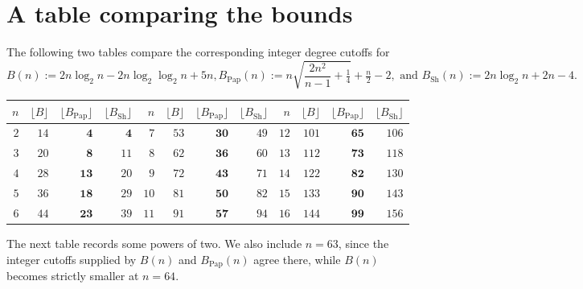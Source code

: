 \documentclass[11pt]{article}
\newtheorem{auxiliary proposition}[theorem]{Auxiliary Proposition}
\newtheorem{main conjecture}[theorem]{Main Conjecture}
\newtheorem{main theorem}[theorem]{Main Theorem}
\newtheorem{modesty proposition}[theorem]{Modesty Proposition}
\newtheorem{open problem}[theorem]{Open Problem}
\newtheorem{convergence lemma}[theorem]{Convergence Lemma}
\newtheorem{corrected lemma}[theorem]{Corrected Lemma}
\newtheorem{growth lemma}[theorem]{Growth Lemma}
\newtheorem{coefficient lemma}[theorem]{Integrality Lemma}
\newtheorem{interpolation lemma}[theorem]{Interpolation Lemma}
\newtheorem{kernel lemma}[theorem]{Kernel Lemma}
\newtheorem{limit lemma}[theorem]{Limit Lemma}
\newtheorem{tandem lemma}[theorem]{Modesty Lemma}
\newtheorem{zero-finding lemma}[theorem]{Zero-Finding Lemma}
\numberwithin{equation}{section}
\begin{document}
\section{A table comparing the bounds}

The following two tables compare the corresponding integer degree
cutoffs for {\small
$$ B(n):=2n\log_2 n-2n\log_2\log_2 n+5n,
B_{\mathrm{Pap}}(n):=n\sqrt{\frac{2n^2}{n-1}+\tfrac14}+\tfrac n2-2,
\text{ and }B_{\mathrm{Sh}}(n):=2n\log_2 n+2n-4. $$}
  

\begin{center}
\scriptsize
\setlength{\tabcolsep}{3pt}
\begin{tabular}{rrrr|rrrr|rrrr}
\toprule
$n$ & $\lfloor B\rfloor$ & $\lfloor B_{\mathrm{Pap}}\rfloor$ & $\lfloor B_{\mathrm{Sh}}\rfloor$ &
$n$ & $\lfloor B\rfloor$ & $\lfloor B_{\mathrm{Pap}}\rfloor$ & $\lfloor B_{\mathrm{Sh}}\rfloor$ &
$n$ & $\lfloor B\rfloor$ & $\lfloor B_{\mathrm{Pap}}\rfloor$ & $\lfloor B_{\mathrm{Sh}}\rfloor$ \\
\midrule
$2$ & $14$ & $\mathbf{4}$ & $\mathbf{4}$
&
$7$ & $53$ & $\mathbf{30}$ & $49$
&
$12$ & $101$ & $\mathbf{65}$ & $106$ \\

$3$ & $20$ & $\mathbf{8}$ & $11$
&
$8$ & $62$ & $\mathbf{36}$ & $60$
&
$13$ & $112$ & $\mathbf{73}$ & $118$ \\


$4$ & $28$ & $\mathbf{13}$ & $20$
&
$9$ & $72$ & $\mathbf{43}$ & $71$
&
$14$ & $122$ & $\mathbf{82}$ & $130$ \\

$5$ & $36$ & $\mathbf{18}$ & $29$
&
$10$ & $81$ & $\mathbf{50}$ & $82$
&
$15$ & $133$ & $\mathbf{90}$ & $143$ \\

$6$ & $44$ & $\mathbf{23}$ & $39$
&
$11$ & $91$ & $\mathbf{57}$ & $94$
&
$16$ & $144$ & $\mathbf{99}$ & $156$ \\
\bottomrule
\end{tabular}
\end{center}

The next table records some powers of two.  We also include $n=63$, since the integer cutoffs supplied by $B(n)$ and $B_{\mathrm{Pap}}(n)$ agree there, while $B(n)$ becomes strictly smaller at $n=64$.
\end{document}

